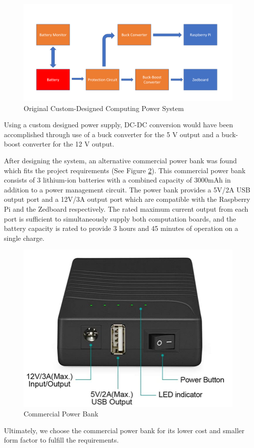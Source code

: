 \begin{figure}[H]
\centering
\includegraphics[width=15cm]{img/Power_Diagram.png}
\caption{Original Custom-Designed Computing Power System}
\label{powerdiag}
\end{figure}

Using a custom designed power supply, DC-DC conversion would have been accomplished through use of a buck converter for the 5 V output and a buck-boost converter for the 12 V output.

After designing the system, an alternative commercial power bank was found which fits the project requirements (See Figure \ref{powerbank}). This commercial power bank consists of 3 lithium-ion batteries with a combined capacity of 3000mAh in addition to a power management circuit. The power bank provides a 5V/2A USB output port and a 12V/3A output port which are compatible with the Raspberry Pi and the Zedboard respectively. The rated maximum current output from each port is sufficient to simultaneously supply both computation boards, and the battery capacity is rated to provide 3 hours and 45 minutes of operation on a single charge.

\begin{figure}[H]
\centering
\includegraphics[width=12cm]{img/power_bank.png}
\caption{Commercial Power Bank}
\label{powerbank}
\end{figure}

Ultimately, we choose the commercial power bank for its lower cost and smaller form factor to fulfill the requirements.
